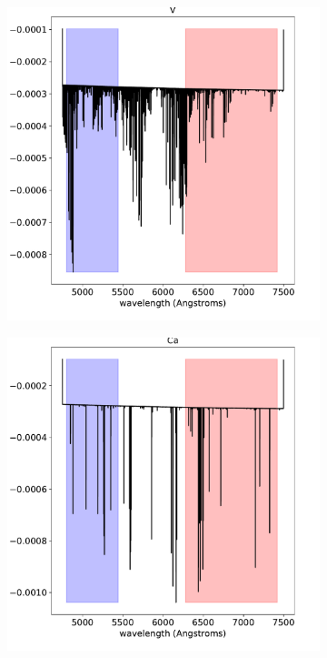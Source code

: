 \documentclass[twocolumn]{aastex631}
\begin{document}
\begin{figure}[ht!]
\begin{subfigure}[b]{0.3\textwidth}
            \end{subfigure}
            \begin{subfigure}[b]{0.3\textwidth}
                \centering
                \includegraphics[width=\textwidth]{plots/spectra/spectrum.KELT-20b.V.5.623e-09.inverted-transmission-better.pdf}
                \label{fig:V-spectrum}
            \end{subfigure}
            \begin{subfigure}[b]{0.3\textwidth}
                \centering
                \includegraphics[width=\textwidth]{plots/spectra/spectrum.KELT-20b.Ca.2.101e-08.inverted-transmission-better.pdf}

\end{subfigure}
\end{figure}
\end{document}
